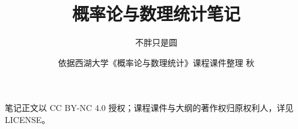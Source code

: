 \documentclass[chinese]{probability}
\title{概率论与数理统计笔记}
\author{不胖只是圆}
\date{依据西湖大学《概率论与数理统计》课程课件整理 \quad 2026 秋}
\begin{document}
\maketitle

\begin{center}
\small 笔记正文以 CC BY-NC 4.0 授权；课程课件与大纲的著作权归原权利人，详见 LICENSE。
\end{center}

\tableofcontents
\newpage






\end{document}
